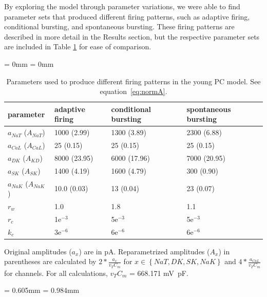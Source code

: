 \documentclass[12pt]{article}
\newcommand{\midsepremove}{\aboverulesep = 0mm \belowrulesep = 0mm}
\newcommand{\midsepdefault}{\aboverulesep = 0.605mm \belowrulesep = 0.984mm}
\begin{document}
By exploring the model through parameter variations, we were able to find parameter sets that produced different firing patterns, such as adaptive firing, conditional bursting, and spontaneous bursting. These firing patterns are described in more detail in the Results section, but the respective parameter sets are included in Table \ref{tab:regimes} for ease of comparison.

\begin{table}[h!]
\centering
 \caption{Parameters used to produce different firing patterns in the young PC model. See equation~\eqref{eq:normA}.} 
\begin{footnotesize}
\midsepremove
\begin{tabular}{p{9em} p{9em}  p{9em}  p{9em}} %
\toprule
\textbf{parameter} & \textbf{adaptive \newline firing} & \textbf{conditional \newline bursting} & \textbf{spontaneous bursting} \\
\toprule
$a_{NaT}$ ($A_{NaT}$) & 1000 (2.99) & 1300 (3.89) & 2300 (6.88) \\
$a_{CaL}$ ($A_{CaL}$)& 25 (0.15) & 25 (0.15) & 25 (0.15) \\
$a_{DK}$ ($A_{KD}$)& 8000 (23.95) & 6000 (17.96) & 7000 (20.95) \\
$a_{SK}$ ($A_{SK}$)& 1400 (4.19) & 1600 (4.79) & 300 (0.90) \\
$a_{NaK}$ ($A_{NaK}$)& 10.0 (0.03) & 13 (0.04) & 23 (0.07) \\
$r_{w}$ & 1.0 & 1.8 & 1.1 \\
$r_{c}$ & 1e$^{-3}$ & 5e$^{-3}$ & 5e$^{-3}$ \\
$k_{c}$ & 3e$^{-6}$ & 6e$^{-6}$ & 6e$^{-6}$ \\
\bottomrule 
\end{tabular}
\vspace{0.2cm}
\begin{flushleft}
\footnotesize{Original amplitudes ($a_x$) are in pA. Reparametrized amplitudes ($A_x$) in parentheses are calculated by $2*\frac{a_x}{v_T C_m}$ for $x \in \left\{NaT,DK,SK,NaK\right\}$ and $4*\frac{a_{CaL}}{v_T C_m}$ for {\Ca} channels. For all calculations, $v_T C_m$ = 668.171 mV~pF.}
\end{flushleft}
\label{tab:regimes}
\end{footnotesize}
\end{table}
\midsepdefault
\end{document}
